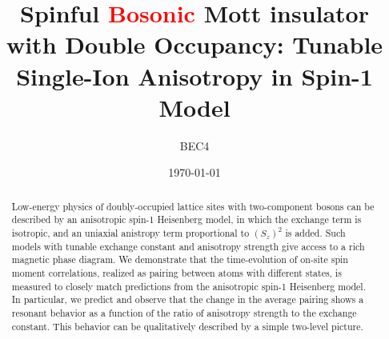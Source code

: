 \documentclass[aps,prl,twocolumn,superscriptaddress]{revtex4-1}
\newcommand{\newmat}[1]{\textcolor{red}{#1}}
\begin{document}
\title{Spinful \newmat{Bosonic} Mott insulator with Double Occupancy: Tunable Single-Ion Anisotropy in Spin-1 Model}
            
\author{BEC4}

\date{\today}

\begin{abstract}
Low-energy physics of doubly-occupied lattice sites with two-component bosons can be described by an anisotropic spin-1 Heisenberg model, in which the exchange term is isotropic, and an uniaxial anistropy term proportional to $(S_z)^2$ is added. Such models with tunable exchange constant and anisotropy strength give access to a rich magnetic phase diagram. We demonstrate that the time-evolution of on-site spin moment correlations, realized as pairing between atoms with different states, is measured to closely match predictions from the anisotropic spin-1 Heisenberg model. In particular, we predict and observe that the change in the average pairing shows a resonant behavior as a function of the ratio of anisotropy strength to the exchange constant. This behavior can be qualitatively described by a simple two-level picture. 
\end{abstract}

\maketitle

\end{document}
